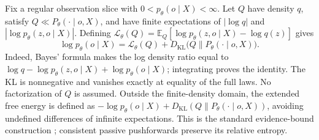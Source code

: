 \documentclass[twoside,11pt]{article}
\begin{document}
Fix a regular observation slice with $0<p_\theta(o\mid X)<\infty$. Let $Q$ have density $q$, satisfy $Q\ll P_\theta(\cdot\mid o,X)$, and have finite expectations of $|\log q|$ and $|\log p_\theta(z,o\mid X)|$. Defining $\mathcal L_\theta(Q)=\mathbb E_Q[\log p_\theta(z,o\mid X)-\log q(z)]$ gives
\begin{equation}
\log p_\theta(o\mid X)=\mathcal L_\theta(Q)+D_{\mathrm{KL}}\bigl(Q\|P_\theta(\cdot\mid o,X)\bigr).
\label{eq:rg_bridge_elbo}
\end{equation}
Indeed, Bayes' formula makes the log density ratio equal to $\log q-\log p_\theta(z,o\mid X)+\log p_\theta(o\mid X)$; integrating proves the identity. The KL is nonnegative and vanishes exactly at equality of the full laws. No factorization of $Q$ is assumed. Outside the finite-density domain, the extended free energy is defined as $-\log p_\theta(o\mid X)+D_{\mathrm{KL}}(Q\|P_\theta(\cdot\mid o,X))$, avoiding undefined differences of infinite expectations. This is the standard evidence-bound construction \citep[Sec.~2.2, Eq.~14]{Blei2017}; consistent passive pushforwards preserve its relative entropy.
\end{document}
